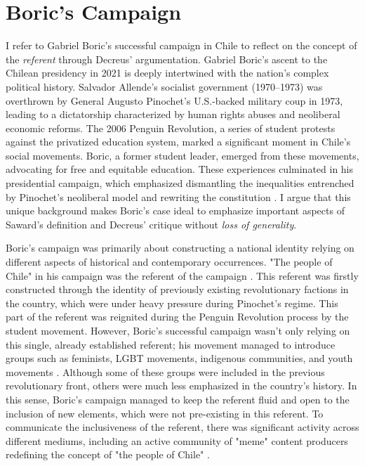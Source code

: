 \chapter{Boric's Campaign}

I refer to Gabriel Boric's successful campaign in Chile to reflect on the
concept of the \textit{referent} through Decreus' argumentation. Gabriel
Boric’s ascent to the Chilean presidency in 2021 is deeply intertwined with the
nation’s complex political history. Salvador Allende’s socialist government
(1970–1973) was overthrown by General Augusto Pinochet’s U.S.-backed military
coup in 1973, leading to a dictatorship characterized by human rights abuses
and neoliberal economic reforms. The 2006 Penguin Revolution, a series of
student protests against the privatized education system, marked a significant
moment in Chile’s social movements. Boric, a former student leader, emerged
from these movements, advocating for free and equitable education. These
experiences culminated in his presidential campaign, which emphasized
dismantling the inequalities entrenched by Pinochet’s neoliberal model and
rewriting the constitution \parencite[]{2024b}. I argue that this unique
background makes Boric's case ideal to emphasize important aspects of Saward's
definition and Decreus' critique without \textit{loss of generality}.

Boric’s campaign was primarily about constructing a national identity relying
on different aspects of historical and contemporary occurrences. "The people of Chile" in his campaign was the referent of the campaign \parencite[]{zilla2022a, manzi, penagonzalez2024}. This referent was firstly constructed through the identity of previously existing revolutionary factions in the country, which were under heavy pressure during Pinochet's regime. This part of the referent was reignited during the Penguin Revolution process by the student movement. However, Boric's successful campaign wasn't only relying on this single, already established referent; his movement managed to introduce groups such as feminists, LGBT movements, indigenous communities, and youth movements \parencite[]{zilla2022a, manzi, penagonzalez2024}. Although some of these groups were included in the previous revolutionary front, others were much less emphasized in the country's history. In this sense, Boric's campaign managed to keep the referent fluid and open to the inclusion of new elements, which were not pre-existing in this referent. To communicate the inclusiveness of the referent, there was significant activity across different mediums, including an active community of "meme" content producers redefining the concept of "the people of Chile" \parencite{fuentes2024}.

